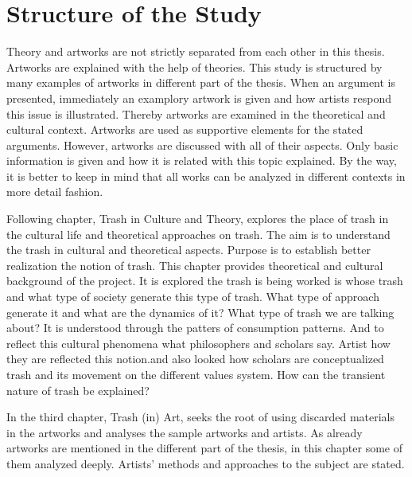 


\section{Structure of the Study}
Theory and artworks are not strictly separated from each other in this thesis. Artworks are explained with the help of theories. This study is structured by many examples of artworks in different part of the thesis. When an argument is presented, immediately an examplory artwork is given and how artists respond this issue is illustrated. Thereby artworks are examined in the theoretical and cultural context. Artworks are used as supportive elements for the stated arguments. However, artworks are discussed with all of their aspects. Only basic information is given and how it is related with this topic explained. By the way, it is better to keep in mind that all works can be analyzed in different contexts in more detail fashion.

Following chapter, Trash in Culture and Theory, explores the place of trash in the cultural life and theoretical approaches on trash. The aim is to understand the trash in cultural and theoretical aspects. Purpose is to establish better realization the notion of trash. This chapter provides theoretical and cultural background of the project. It is explored the trash is being worked is whose trash and what type of society generate this type of trash. What type of approach generate it and what are the dynamics of it? What type of trash we are talking about? It is understood through the patters of consumption patterns. And to reflect this cultural phenomena what philosophers and scholars say. Artist how they are reflected this notion.and also looked how scholars are conceptualized trash and its movement on the different values system. How can the transient nature of trash be explained?

In the third chapter, Trash (in) Art, seeks the root of using discarded materials in the artworks and analyses the sample artworks and artists. As already artworks are mentioned in the different part of the thesis, in this chapter some of them analyzed deeply. Artists’ methods and approaches to the subject are stated.

